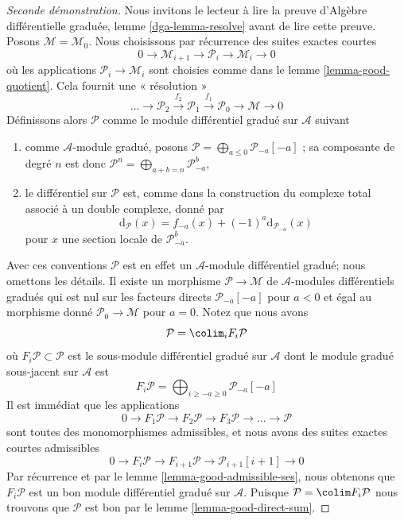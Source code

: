\begin{proof}[Seconde démonstration]
Nous invitons le lecteur à lire la preuve d'Algèbre différentielle graduée, lemme \ref{dga-lemma-resolve}  avant de lire cette preuve.
Posons $\mathcal{M} = \mathcal{M}_0$.
Nous choisissons par récurrence des suites exactes courtes
$$
0 \to \mathcal{M}_{i + 1} \to \mathcal{P}_i \to \mathcal{M}_i \to 0
$$
où les applications $\mathcal{P}_i \to \mathcal{M}_i$ sont choisies comme dans le lemme \ref{lemma-good-quotient}.
Cela fournit une « résolution »
$$
\ldots \to \mathcal{P}_2 \xrightarrow{f_2}
\mathcal{P}_1 \xrightarrow{f_1} \mathcal{P}_0 \to \mathcal{M} \to 0
$$
Définissons alors $\mathcal{P}$ comme le module différentiel gradué sur $\mathcal{A}$ suivant
\begin{enumerate}
\item comme $\mathcal{A}$-module gradué, posons $\mathcal{P} = \bigoplus_{a \leq 0} \mathcal{P}_{-a}[-a]$ ; sa composante de degré $n$ est donc $\mathcal{P}^n = \bigoplus\nolimits_{a + b = n} \mathcal{P}_{-a}^b$, \item le différentiel sur $\mathcal{P}$ est, comme dans la construction du complexe total associé à un double complexe, donné par
$$
\text{d}_\mathcal{P}(x) = f_{-a}(x) + (-1)^a \text{d}_{\mathcal{P}_{-a}}(x)
$$
pour $x$ une section locale de $\mathcal{P}_{-a}^b$.
\end{enumerate}
Avec ces conventions $\mathcal{P}$ est en effet un $\mathcal{A}$-module différentiel gradué; nous omettons les détails.
Il existe un morphisme $\mathcal{P} \to \mathcal{M}$ de $\mathcal{A}$-modules différentiels gradués qui est nul sur les facteurs directs $\mathcal{P}_{-a}[-a]$ pour $a < 0$ et égal au morphisme donné $\mathcal{P}_0 \to \mathcal{M}$ pour $a = 0$.
Notez que nous avons
$$
\mathcal{P} = \colim_i F_i\mathcal{P}
$$
où $F_i\mathcal{P} \subset \mathcal{P}$ est le sous-module différentiel gradué sur $\mathcal{A}$ dont le module gradué sous-jacent sur $\mathcal{A}$ est
$$
F_i\mathcal{P} =
\bigoplus\nolimits_{i \geq -a \geq 0} \mathcal{P}_{-a}[-a]
$$
Il est immédiat que les applications
$$
0 \to F_1\mathcal{P} \to F_2\mathcal{P} \to F_3\mathcal{P} \to
\ldots \to \mathcal{P}
$$
sont toutes des monomorphismes admissibles, et nous avons des suites exactes courtes admissibles
$$
0 \to F_i\mathcal{P} \to
F_{i + 1}\mathcal{P} \to
\mathcal{P}_{i + 1}[i + 1] \to 0
$$
Par récurrence et par le lemme \ref{lemma-good-admissible-ses}, nous obtenons que $F_i\mathcal{P}$ est un bon module différentiel gradué sur $\mathcal{A}$.
Puisque $\mathcal{P} = \colim F_i\mathcal{P}$ nous trouvons que $\mathcal{P}$ est bon par le lemme \ref{lemma-good-direct-sum}.


\end{proof}
